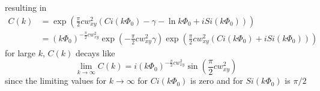 \documentclass[%
 reprint,
 amsmath,amssymb,
 aps,
]{revtex4-1}
\begin{document}
resulting in
\begin{equation}
	\begin{aligned}
	C(k) &= \exp\left(\frac{\pi}{2}cw_{xy}^{2}\left(Ci(k\Phi_{0})-\gamma-\ln k\Phi_{0}+iSi(k\Phi_{0})\right)\right)\\
	&=(k\Phi_{0})^{-\frac{\pi}{2}cw_{xy}^{2}}\exp\left(-\frac{\pi}{2}cw_{xy}^{2}\gamma\right)\exp\left(\frac{\pi}{2}cw_{xy}^{2}\left(Ci(k\Phi_{0})+iSi(k\Phi_{0})\right)\right)
	\end{aligned}
\end{equation}
for large $k$, $C(k)$ decays like
\begin{equation}
	\lim_{k\rightarrow \infty} C(k) = i(k\Phi_{0})^{-\frac{\pi}{2}cw_{xy}^{2}}\sin \left(\frac{\pi}{2}cw_{xy}^{2}\right)
\end{equation}
since the limiting values for $k\rightarrow \infty$ for $Ci(k\Phi_{0})$ is zero and for $Si(k\Phi_{0})$ is $\pi/2$
\end{document}
